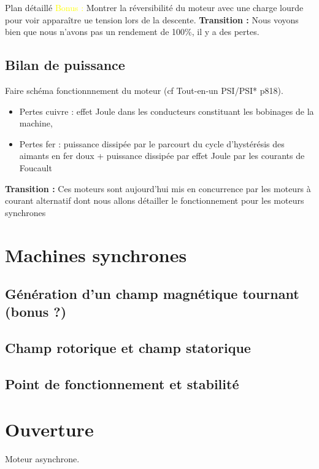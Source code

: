 \begin{reportBlock}{Plan détaillé}
\textcolor{yellow}{Bonus :} Montrer la réversibilité du moteur avec une charge lourde pour voir apparaître ue tension lors de la descente.
\textbf{Transition : }Nous voyons bien que nous n'avons pas un rendement de 100\%, il y a des pertes.
\subsection{Bilan de puissance}
Faire schéma fonctionnnement du moteur (cf Tout-en-un PSI/PSI* p818).
\begin{itemize}
    \item Pertes cuivre : effet Joule dans les conducteurs constituant les bobinages de la machine,
    \item Pertes fer : puissance dissipée par le parcourt du cycle d'hystérésis des aimants en fer doux + puissance dissipée par effet Joule par les courants de Foucault 
    
\end{itemize}

\textbf{Transition :} Ces moteurs sont aujourd'hui mis en concurrence par les moteurs à courant alternatif dont nous allons détailler le fonctionnement pour les moteurs synchrones 

\section{Machines synchrones}
\subsection{Génération d'un champ magnétique tournant (bonus ?)}
\subsection{Champ rotorique et champ statorique}
\subsection{Point de fonctionnement et stabilité}

\section*{Ouverture}
Moteur asynchrone.
\end{reportBlock}